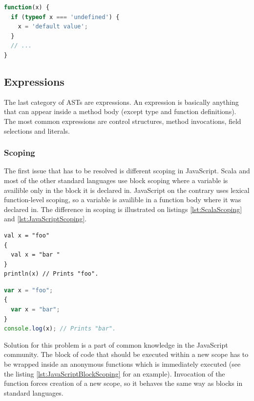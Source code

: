 \documentclass[12pt,a4paper]{report}
\begin{document}
\begin{lstlisting}[language=JavaScript,caption={Default parameters in JavaScript.},label={lst:JavaScriptDefaultParameters}]
function(x) {
  if (typeof x === 'undefined') {
    x = 'default value';	
  }
  // ...
}
\end{lstlisting}

\subsection{Expressions}

The last category of ASTs are expressions. An expression is basically anything that can appear inside a method body (except type and function definitions). The most common expressions are control structures, method invocations, field selections and literals.

\subsubsection*{Scoping}

The first issue that has to be resolved is different scoping in JavaScript. Scala and most of the other standard languages use block scoping where a variable is availible only in the block it is declared in. JavaScript on the contrary uses lexical function-level scoping, so a variable is availible in a function body where it was declared in. The difference in scoping is illustrated on listings \ref{lst:ScalaScoping} and \ref{lst:JavaScriptScoping}.

\begin{center}
\begin{minipage}{.48\textwidth}
  \begin{lstlisting}[caption={Scala scoping.},label={lst:ScalaScoping}]
val x = "foo"
{ 
  val x = "bar " 
}
println(x) // Prints "foo".
	\end{lstlisting}
\end{minipage}
\hfill
\begin{minipage}{.48\textwidth}
  \begin{lstlisting}[language=JavaScript,caption={JavaScript scoping.},label={lst:JavaScriptScoping}]
var x = "foo";
{ 
  var x = "bar";
}
console.log(x); // Prints "bar".
  \end{lstlisting}
\end{minipage}
\end{center}

Solution for this problem is a part of common knowledge in the JavaScript community. The block of code that should be executed within a new scope has to be wrapped inside an anonymous functions which is immediately executed (see the listing \ref{lst:JavaScriptBlockScoping} for an example). Invocation of the function forces creation of a new scope, so it behaves the same way as blocks in standard languages.
\end{document}
